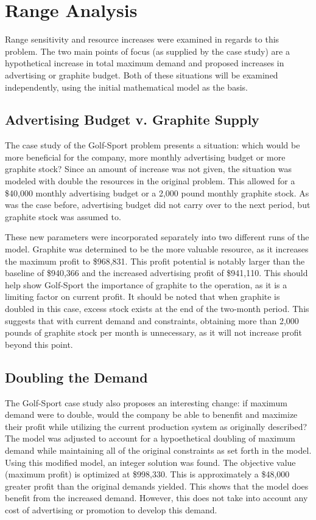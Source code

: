 \documentclass{article}
\begin{document}
\section{Range Analysis}
Range sensitivity and resource increases were examined in regards to this problem.  The two main points of focus (as supplied by the case study) are a hypothetical increase in total maximum demand and proposed increases in advertising or graphite budget.  Both of these situations 
will be examined independently, using the initial mathematical model as the basis.
\subsection{Advertising Budget v. Graphite Supply}
The case study of the Golf-Sport problem presents a situation:  which would be more beneficial for the company, more monthly advertising budget or more graphite stock?  Since an amount of increase was not given, the situation was modeled with double the resources in the original problem.  
This allowed for a \$40,000 monthly advertising budget or a 2,000 pound monthly graphite stock.  As was the case before, advertising budget did not carry over to the next period, but graphite stock was assumed to.
\par
These new parameters were incorporated separately into two different runs of the model.  Graphite was determined to be the more valuable resource, as it increases the maximum profit to \$968,831.  This profit potential is notably larger than the baseline of \$940,366 and the increased advertising 
profit of \$941,110.  This should help show Golf-Sport the importance of graphite to the operation, as it is a limiting factor on current profit.  It should be noted that when graphite is doubled in this case, excess stock exists at the end of the two-month period.  This suggests that with current demand and constraints, obtaining more than 2,000 pounds of graphite stock per month is unnecessary, 
as it will not increase profit beyond this point.
\subsection{Doubling the Demand}
The Golf-Sport case study also proposes an interesting change:  if maximum demand were to double, would the company be able to benenfit and maximize their profit while utilizing the current production system as originally described?  The model was adjusted to account for a hypoethetical doubling of maximum demand while maintaining all of the original constraints as set forth in the model.  
Using this modified model, an integer solution was found.  The objective value (maximum profit) is optimized at \$998,330.  This is approximately a \$48,000 greater profit than the original demands yielded.  This shows that the model does benefit from the increased demand.  However, this does not take into account any cost of advertising or promotion to develop this demand.
\end{document}
